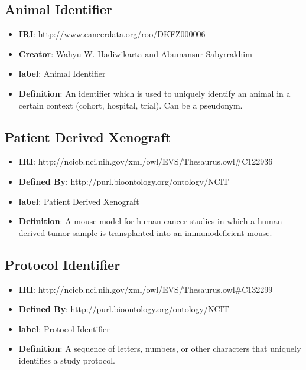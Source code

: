 \documentclass[a4paper,12pt,oneside]{article}
\begin{document}
  \subsection{Animal Identifier}

  \begin{itemize}
      \item \textbf{IRI}: http://www.cancerdata.org/roo/DKFZ000006
      \item \textbf{Creator}: Wahyu W. Hadiwikarta and Abumansur Sabyrrakhim
      \item \textbf{label}: Animal Identifier
      \item \textbf{Definition}: An identifier which is used to uniquely identify an animal in a certain context (cohort, hospital, trial). Can be a pseudonym.
  \end{itemize}

  
  \subsection{Patient Derived Xenograft}

   \begin{itemize}
      \item \textbf{IRI}: http://ncicb.nci.nih.gov/xml/owl/EVS/Thesaurus.owl\#C122936
      \item \textbf{Defined By}: http://purl.bioontology.org/ontology/NCIT
      \item \textbf{label}: Patient Derived Xenograft
      \item \textbf{Definition}: A mouse model for human cancer studies in which a human-derived tumor sample is transplanted into an immunodeficient mouse.
  \end{itemize}  
  
  \subsection{Protocol Identifier}

   \begin{itemize}
      \item \textbf{IRI}: http://ncicb.nci.nih.gov/xml/owl/EVS/Thesaurus.owl\#C132299
      \item \textbf{Defined By}: http://purl.bioontology.org/ontology/NCIT
      \item \textbf{label}: Protocol Identifier
      \item \textbf{Definition}: A sequence of letters, numbers, or other characters that uniquely identifies a study protocol.
  \end{itemize}
  
\end{document}
